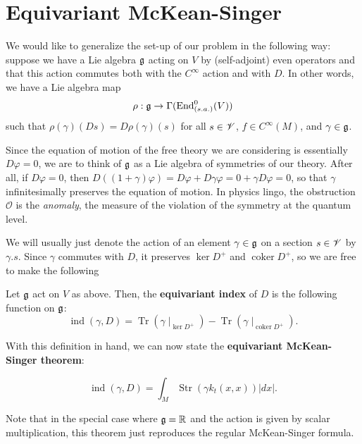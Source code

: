 \documentclass[11pt]{amsart}
\newcommand{\mbb}{\mathbb}
\newcommand{\R}{\mbb R}
\DeclareMathOperator{\Tr}{Tr} \DeclareMathOperator{\Cyc}{Cyc}
\numberwithin{equation}{section}
\newcommand{\cinfty}{C^{\infty}}
\newcommand\ind{\operatorname{ind}}
\newcommand\Str{\operatorname{Str}}
\newcommand\coker{\operatorname{coker}}
\begin{document}
\section{Equivariant McKean-Singer}
We would like to generalize the set-up of our problem in the following way: suppose we have a Lie algebra $\mathfrak g$ acting on $V$ by (self-adjoint) even operators and that this action commutes both with the $\cinfty$ action and with $D$. In other words, we have a Lie algebra map
\[
\rho: \mathfrak g \to \Gamma(\operatorname{End}_{(s.a.)}^0(V))
\]
such that $\rho(\gamma)(Ds)=D\rho(\gamma)(s)$ for all $s\in \mathscr V$, $f\in \cinfty(M)$, and $\gamma\in \mathfrak g$. 
\begin{remark}
	Since the equation of motion of the free theory we are considering is essentially $D\varphi = 0$, we are to think of $\mathfrak g$ as a Lie algebra of symmetries of our theory. After all, if $D\varphi =0$, then $D((1+\gamma)\varphi)=D\varphi +D\gamma \varphi = 0+\gamma D\varphi = 0$, so that $\gamma$ infinitesimally preserves the equation of motion. In physics lingo, the obstruction $\mathcal O$ is the \textit{anomaly}, the measure of the violation of the symmetry at the quantum level. 
\end{remark}
We will usually just denote the action of an element $\gamma\in \mathfrak g$ on a section $s\in \mathscr V$ by $\gamma.s$. Since $\gamma$ commutes with $D$, it preserves $\ker D^+$ and $\coker D^+$, so we are free to make the following
\begin{definition}
	Let $\mathfrak g$ act on $V$ as above. Then, the \textbf{equivariant index} of $D$ is the following function on $\mathfrak g$:
	\[
	\ind(\gamma, D)= \Tr(\gamma\mid_{\ker D^+})-\Tr(\gamma\mid_{\coker D^+}).
	\]
\end{definition}
With this definition in hand, we can now state the \textbf{equivariant McKean-Singer theorem}:
\begin{theorem}
\begin{equation}
	\label{eq: eqmcs}
	\ind(\gamma, D) = \int_M \Str(\gamma k_t(x,x))|dx|.
\end{equation}
\end{theorem} 
Note that in the special case where $\fg = \R$ and the action is given by scalar multiplication, this theorem just reproduces the regular McKean-Singer formula.
\end{document}

